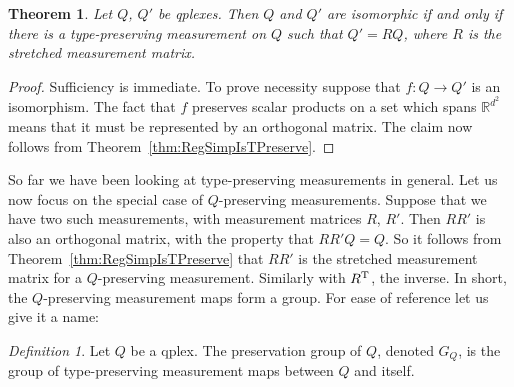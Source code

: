 \documentclass[aps,pra,superscriptaddress,10pt,tightenlines,twocolumn,nofootinbib]{revtex4}
\newtheorem{theorem}{Theorem}
\theoremstyle{remark}
\newtheorem{definition}{Definition}
\newcommand{\ea}[1]{\begin{align}#1\end{align}}
\newcommand{\fd}[1]{\mathbb{#1}}
\newcommand{\vpu}[1]{^{\vphantom{#1}}}
\newcommand{\qp}{Q}
\newcommand{\qplex}{qplex}
\newcommand{\qplexes}{qplexes}
\newcommand{\qgp}[1]{G_{#1}}
\begin{document}
\begin{theorem}
Let $\qp$, $\qp'$ be \qplexes.  Then $\qp$ and $\qp'$ are isomorphic if and only if there is a type-preserving measurement on $\qp$ such that $\qp' = R\qp$, where $R$ is the stretched measurement matrix.
\end{theorem}
\begin{proof}
Sufficiency is immediate.  To prove necessity suppose that $f\colon \qp \to \qp'$ is an isomorphism.  The fact that $f$ preserves scalar products on a set which spans $\fd{R}^{d^2}$ means that it must be represented by an orthogonal matrix.  The claim now follows from Theorem~\ref{thm:RegSimpIsTPreserve}.
\end{proof}
So far we have been looking at type-preserving measurements in general.  Let us now focus on the special case of $\qp$-preserving measurements.  Suppose that we have two such measurements, with measurement matrices $R$, $R'$.  Then $RR'$ is also an orthogonal matrix, with the property that $RR'\qp = \qp$.  So it follows from Theorem~\ref{thm:RegSimpIsTPreserve} that $RR'$ is the stretched measurement matrix for a $\qp$-preserving measurement.  Similarly with $R^{\rm{T}}$, the inverse.  In short,  the $\qp$-preserving measurement maps form a group.  For ease of reference let us give it a name:
\begin{definition}
Let $\qp$ be a \qplex.  The preservation group of $\qp$, denoted $\qgp{\qp}$, is the group of type-preserving measurement maps between $\qp$ and itself.
\end{definition}
\end{document}
